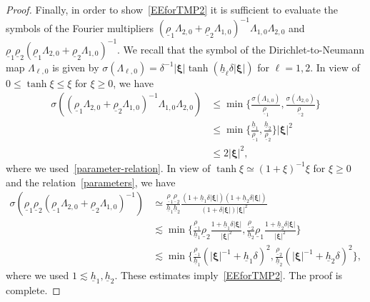 \documentclass[11pt,leqno]{article}
\numberwithin{equation}{section}
\numberwithin{figure}{section}
\begin{document}
\begin{proof}
Finally, in order to show~\eqref{EEforTMP2} it is sufficient to evaluate the symbols of the Fourier multipliers 
$(\underline{\rho}_1\Lambda_{2,0}+\underline{\rho}_2\Lambda_{1,0})^{-1}\Lambda_{1,0}\Lambda_{2,0}$ 
and $\underline{\rho}_1\underline{\rho}_2(\underline{\rho}_1\Lambda_{2,0}+\underline{\rho}_2\Lambda_{1,0})^{-1}$. 
We recall that the symbol of the Dirichlet-to-Neumann map $\Lambda_{\ell,0}$ is given by 
$\sigma(\Lambda_{\ell,0})=\delta^{-1}|\bm{\xi}|\tanh(\underline{h}_\ell\delta|\bm{\xi}|)$ for $\ell=1,2$. 
In view of $0\leq\tanh\xi\leq\xi$ for $\xi\geq0$, we have 
%
\begin{align*}
\sigma((\underline{\rho}_1\Lambda_{2,0}+\underline{\rho}_2\Lambda_{1,0})^{-1}\Lambda_{1,0}\Lambda_{2,0})
&\leq \min\biggl\{ \frac{\sigma({\Lambda}_{1,0})}{\underline{\rho}_1}, \frac{\sigma({\Lambda}_{2,0})}{\underline{\rho}_2} \biggr\} \\
&\leq \min\biggl\{ \frac{\underline{h}_1}{\underline{\rho}_1}, \frac{\underline{h}_2}{\underline{\rho}_2} \biggr\}|\bm{\xi}|^2 \\
&\leq 2|\bm{\xi}|^2,
\end{align*}
%
where we used~\eqref{parameter-relation}. 
In view of $\tanh\xi \simeq (1+\xi)^{-1}\xi$ for $\xi\geq0$ and the relation~\eqref{parameters}, we have 
%
\begin{align*}
\sigma(\underline{\rho}_1\underline{\rho}_2(\underline{\rho}_1\Lambda_{2,0}+\underline{\rho}_2\Lambda_{1,0})^{-1})
&\simeq \frac{\underline{\rho}_1\underline{\rho}_2}{\underline{h}_1\underline{h}_2}
 \frac{(1+\underline{h}_1\delta|\bm{\xi}|)(1+\underline{h}_2\delta|\bm{\xi}|)}{(1+\delta|\bm{\xi}|)|\bm{\xi}|^2} \\
&\lesssim \min\biggl\{ 
 \frac{\underline{\rho}_1}{\underline{h}_1}\underline{\rho}_2\frac{1+\underline{h}_1\delta|\bm{\xi}|}{|\bm{\xi}|^2}, 
 \frac{\underline{\rho}_2}{\underline{h}_2}\underline{\rho}_1\frac{1+\underline{h}_2\delta|\bm{\xi}|}{|\bm{\xi}|^2} \biggr\} \\
&\lesssim \min\biggl\{ 
 \frac{\underline{\rho}_1}{\underline{h}_1}(|\bm{\xi}|^{-1}+\underline{h}_1\delta)^2, 
 \frac{\underline{\rho}_2}{\underline{h}_2}(|\bm{\xi}|^{-1}+\underline{h}_2\delta)^2 \biggr\},
\end{align*}
%
where we used $1\lesssim \underline{h}_1,\underline{h}_2$. 
These estimates imply~\eqref{EEforTMP2}. 
The proof is complete. 
\end{proof}


\end{document}
